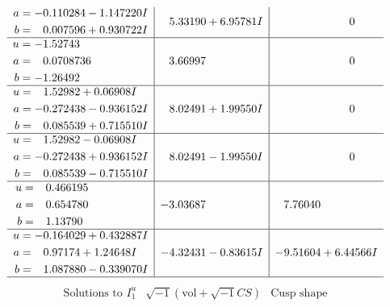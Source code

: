 \documentclass[1p]{elsarticle_modified}
\theoremstyle{definition}
\newcommand{\I}{\sqrt{-1}}
\begin{document}
$$\begin{array}{c|c|c}
\begin{aligned}
a &= -0.110284 - 1.147220 I \\
b &= \phantom{-}0.007596 + 0.930722 I\end{aligned}
 & \phantom{-}5.33190 + 6.95781 I & \phantom{-0.000000 } 0 \\ \hline\begin{aligned}
u &= -1.52743\phantom{ +0.000000I} \\
a &= \phantom{-}0.0708736\phantom{ +0.000000I} \\
b &= -1.26492\phantom{ +0.000000I}\end{aligned}
 & \phantom{-}3.66997\phantom{ +0.000000I} & \phantom{-0.000000 } 0 \\ \hline\begin{aligned}
u &= \phantom{-}1.52982 + 0.06908 I \\
a &= -0.272438 - 0.936152 I \\
b &= \phantom{-}0.085539 + 0.715510 I\end{aligned}
 & \phantom{-}8.02491 + 1.99550 I & \phantom{-0.000000 } 0 \\ \hline\begin{aligned}
u &= \phantom{-}1.52982 - 0.06908 I \\
a &= -0.272438 + 0.936152 I \\
b &= \phantom{-}0.085539 - 0.715510 I\end{aligned}
 & \phantom{-}8.02491 - 1.99550 I & \phantom{-0.000000 } 0 \\ \hline\begin{aligned}
u &= \phantom{-}0.466195\phantom{ +0.000000I} \\
a &= \phantom{-}0.654780\phantom{ +0.000000I} \\
b &= \phantom{-}1.13790\phantom{ +0.000000I}\end{aligned}
 & -3.03687\phantom{ +0.000000I} & \phantom{-}7.76040\phantom{ +0.000000I} \\ \hline\begin{aligned}
u &= -0.164029 + 0.432887 I \\
a &= \phantom{-}0.97174 + 1.24648 I \\
b &= \phantom{-}1.087880 - 0.339070 I\end{aligned}
 & -4.32431 - 0.83615 I & -9.51604 + 6.44566 I\\
 \hline 
 \end{array}$$\newpage$$\begin{array}{c|c|c}  
\text{Solutions to }I^u_{1}& \I (\text{vol} + \sqrt{-1}CS) & \text{Cusp shape}\\

\end{array}$$
\end{document}
